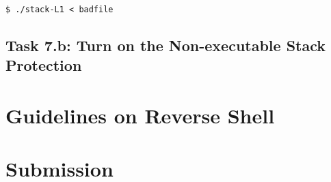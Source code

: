 \begin{lstlisting}
$ ./stack-L1 < badfile 
\end{lstlisting}
 

\subsection{Task 7.b: Turn on the Non-executable Stack Protection}




\section{Guidelines on Reverse Shell} 
\label{sec:guildelines}






\section{Submission}





